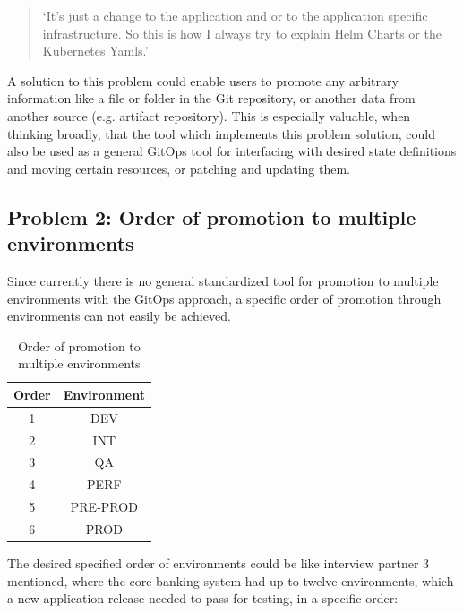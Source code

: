 \begin{quotation}
	\noindent
	\enquote*{It's just a change to the application and or to the application specific infrastructure. So this is how I always try to explain Helm Charts or the Kubernetes Yamls.}
\end{quotation}

A solution to this problem could enable users to promote any arbitrary information
like a file or folder in the Git repository,
or another data from another source (e.g. artifact repository).
This is especially valuable, when thinking broadly, that the tool
which implements this problem solution, could also be used as a general
GitOps tool for interfacing with desired state definitions and moving certain
resources, or patching and updating them.

\subsection{Problem 2: Order of promotion to multiple environments}
\label{problem2}

Since currently there is no general standardized tool for promotion to multiple environments with the GitOps approach,
a specific order of promotion through environments can not easily be achieved.

\begin{table}[h]
	\begin{center}
		\begin{tabular}{||c c||} 
			\hline
			Order & Environment \\ [0.5ex] 
			\hline\hline
			1 & DEV \\ 
			\hline
			2 & INT \\ 
			\hline
			3 & QA \\
			\hline
			4 & PERF \\
			\hline
			5 & PRE-PROD \\
			\hline
			6 & PROD \\
			\hline
		\end{tabular}
		\caption{Order of promotion to multiple environments}
		\label{table:order-promotion-multi-env}
	\end{center}
\end{table}

The desired specified order of environments could be like interview partner 3 mentioned,
where the core banking system had up to twelve environments,
which a new application release needed to pass for testing,
in a specific order:

